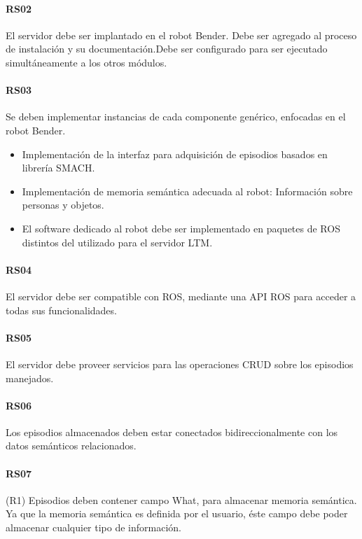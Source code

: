 \paragraph{RS02}
El servidor debe ser implantado en el robot Bender. Debe ser agregado al proceso de instalación y su documentación.Debe ser configurado para ser ejecutado simultáneamente a los otros módulos.

\paragraph{RS03}
Se deben implementar instancias de cada componente genérico, enfocadas en el robot Bender.
\begin{itemize}
	\item Implementación de la interfaz para adquisición de episodios basados en librería SMACH.
	\item Implementación de memoria semántica adecuada al robot: Información sobre personas y objetos.
	\item El software dedicado al robot debe ser implementado en paquetes de ROS distintos del utilizado para el servidor LTM.
\end{itemize}

\paragraph{RS04}
El servidor debe ser compatible con ROS, mediante una API ROS para acceder a todas sus funcionalidades.

\paragraph{RS05}
El servidor debe proveer servicios para las operaciones CRUD sobre los episodios manejados.

\paragraph{RS06}
Los episodios almacenados deben estar conectados bidireccionalmente con los datos semánticos relacionados.

\paragraph{RS07}
(R1) Episodios deben contener campo What, para almacenar memoria semántica. Ya que la memoria semántica es definida por el usuario, éste campo debe poder almacenar cualquier tipo de información.

